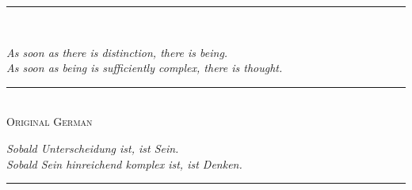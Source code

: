 \documentclass[12pt,a4paper,twoside]{article}
\theoremstyle{plain}
\theoremstyle{definition}
\theoremstyle{remark}
\begin{document}
\begin{center}
\begin{minipage}{0.72\textwidth}
\centering
{\color{darkgray!70}\rule{0.42\textwidth}{0.35pt}}\\[2.2em]
{\Large\itshape
As soon as there is distinction, there is being.\\[0.35em]
As soon as being is sufficiently complex, there is thought.\par}
\vspace{2.2em}
{\color{darkgray!45}\rule{0.18\textwidth}{0.3pt}}\\[1.6em]
{\footnotesize\scshape Original German}\\[0.7em]
{\normalsize\itshape
Sobald Unterscheidung ist, ist Sein.\\[0.25em]
Sobald Sein hinreichend komplex ist, ist Denken.\par}
\vspace{2.2em}
{\color{darkgray!70}\rule{0.42\textwidth}{0.35pt}}
\end{minipage}
\end{center}
\vspace*{\fill}
\newpage
\end{document}
